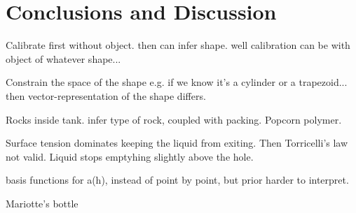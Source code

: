 \documentclass[openacc]{rsproca_new}%
\begin{document}
\section{Conclusions and Discussion}


Calibrate first without object. then can infer shape. well calibration can be with object of whatever shape...

Constrain the space of the shape e.g. if we know it's a cylinder or a trapezoid... then vector-representation of the shape differs.

Rocks inside tank. infer type of rock, coupled with packing. Popcorn polymer.

Surface tension dominates keeping the liquid from exiting. Then Torricelli's law not valid. Liquid stops emptyhing slightly above the hole. 

basis functions for a(h), instead of point by point, but prior harder to interpret.

Mariotte's bottle \cite{kirevs2006mariotte}

\enlargethispage{20pt}




\vskip2pc



\end{document}
